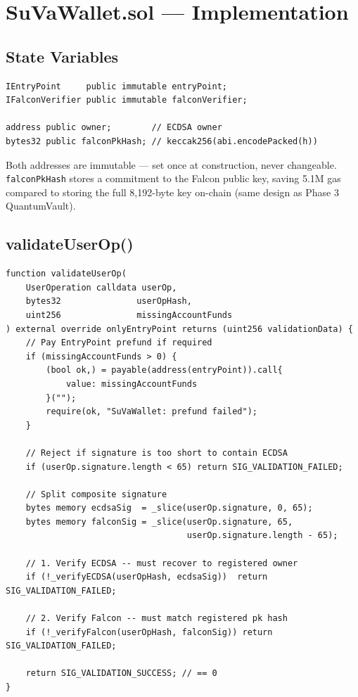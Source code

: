 \documentclass[11pt,a4paper]{article}
\begin{document}
\section{SuVaWallet.sol --- Implementation}

\subsection{State Variables}

\begin{lstlisting}[style=solidity, caption={SuVaWallet state}]
IEntryPoint     public immutable entryPoint;
IFalconVerifier public immutable falconVerifier;

address public owner;        // ECDSA owner
bytes32 public falconPkHash; // keccak256(abi.encodePacked(h))
\end{lstlisting}

Both addresses are immutable --- set once at construction, never changeable.
\texttt{falconPkHash} stores a commitment to the Falcon public key, saving 5.1M gas
compared to storing the full 8,192-byte key on-chain (same design as Phase 3 QuantumVault).

\subsection{validateUserOp()}

\begin{lstlisting}[style=solidity, caption={validateUserOp --- core dual-sig logic}]
function validateUserOp(
    UserOperation calldata userOp,
    bytes32               userOpHash,
    uint256               missingAccountFunds
) external override onlyEntryPoint returns (uint256 validationData) {
    // Pay EntryPoint prefund if required
    if (missingAccountFunds > 0) {
        (bool ok,) = payable(address(entryPoint)).call{
            value: missingAccountFunds
        }("");
        require(ok, "SuVaWallet: prefund failed");
    }

    // Reject if signature is too short to contain ECDSA
    if (userOp.signature.length < 65) return SIG_VALIDATION_FAILED;

    // Split composite signature
    bytes memory ecdsaSig  = _slice(userOp.signature, 0, 65);
    bytes memory falconSig = _slice(userOp.signature, 65,
                                    userOp.signature.length - 65);

    // 1. Verify ECDSA -- must recover to registered owner
    if (!_verifyECDSA(userOpHash, ecdsaSig))  return SIG_VALIDATION_FAILED;

    // 2. Verify Falcon -- must match registered pk hash
    if (!_verifyFalcon(userOpHash, falconSig)) return SIG_VALIDATION_FAILED;

    return SIG_VALIDATION_SUCCESS; // == 0
}
\end{lstlisting}
\end{document}
